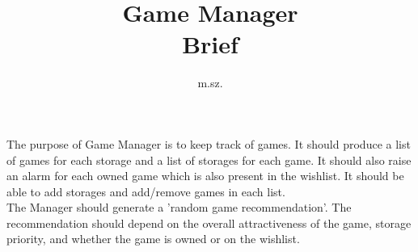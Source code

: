 \documentclass{article}
\title{Game Manager\\ Brief}
\author{m.sz.}
\begin{document}
\maketitle

The purpose of Game Manager is to keep track of games. It should produce a list
of games for each storage and a list of storages for each game. It should also
raise an alarm for each owned game which is also present in the wishlist. It
should be able to add storages and add/remove games in each list.\\
The Manager should generate a 'random game recommendation'. The recommendation
should depend on the overall attractiveness of the game, storage priority, and 
whether the game is owned or on the wishlist.
\end{document}
